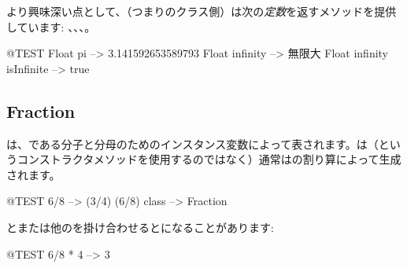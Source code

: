 \documentclass[a4paper,10pt,twoside]{book}
\begin{document}
より興味深い点として、（\ie つまりのクラス側）は次の\emph{定数}を返すメソッドを提供しています: 、、、。

\begin{code}{@TEST}
Float pi                      --> 3.141592653589793
Float infinity               --> 無限大
Float infinity isInfinite --> true
\end{code}

\subsection{Fraction}

は、である分子と分母のためのインスタンス変数によって表されます。は（というコンストラクタメソッドを使用するのではなく）通常はの割り算によって生成されます。

\begin{code}{@TEST}
6/8             --> (3/4)
(6/8) class --> Fraction
\end{code}

とまたは他のを掛け合わせるとになることがあります:

\begin{code}{@TEST}
6/8 * 4 --> 3
\end{code}

\end{document}
